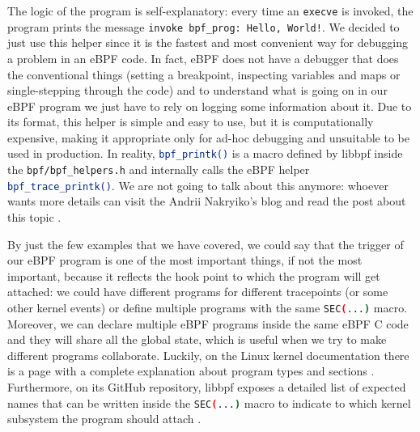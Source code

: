 The logic of the program is self-explanatory: every time an \colorbox{backcolour}{\lstinline[style=commandline, language=bash, breaklines=true]|execve|} is invoked, the program prints the message \colorbox{backcolour}{\lstinline[style=commandline, language=bash, breaklines=true]|invoke bpf_prog: Hello, World!|}.
We decided to just use this helper since it is the fastest and most convenient way for debugging a problem in an eBPF code.
In fact, eBPF does not have a debugger that does the conventional things (setting a breakpoint, inspecting variables and maps or single-stepping through the code) and to understand what is going on in our eBPF program we just have to rely on logging some information about it.
Due to its format, this helper is simple and easy to use, but it is computationally expensive, making it appropriate only for ad-hoc debugging and unsuitable to be used in production.
In reality, \colorbox{backcolour}{\lstinline[style=commandline, language=bash, breaklines=true]|bpf_printk()|} is a macro defined by libbpf inside the \colorbox{backcolour}{\lstinline[style=commandline, language=bash, breaklines=true]|bpf/bpf_helpers.h|} and internally calls the eBPF helper \colorbox{backcolour}{\lstinline[style=commandline, language=bash, breaklines=true]|bpf_trace_printk()|}.
We are not going to talk about this anymore: whoever wants more details can visit the Andrii Nakryiko's blog and read the post about this topic \cite{ANbpfprintk}.

By just the few examples that we have covered, we could say that the trigger of our eBPF program is one of the most important things, if not the most important, because it reflects the hook point to which the program will get attached: we could have different programs for different tracepoints (or some other kernel events) or define multiple programs with the same \colorbox{backcolour}{\lstinline[style=commandline, language=bash, breaklines=true]|SEC(...)|} macro.
Moreover, we can declare multiple eBPF programs inside the same eBPF C code and they will share all the global state, which is useful when we try to make different programs collaborate.
Luckily, on the Linux kernel documentation there is a page with a complete explanation about program types and sections \cite{SecLinuxKernelDoc}.
Furthermore, on its GitHub repository, libbpf exposes a detailed list of expected names that can be written inside the \colorbox{backcolour}{\lstinline[style=commandline, language=bash, breaklines=true]|SEC(...)|} macro to indicate to which kernel subsystem the program should attach \cite{SecListlibbpf}.

